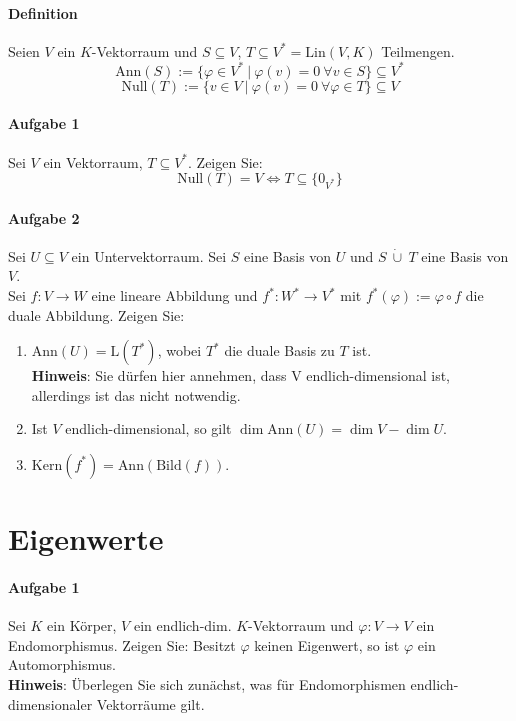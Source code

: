 \documentclass{scrartcl}
\begin{document}
	\paragraph{Definition}
	Seien $V$ ein $K$-Vektorraum und $S\subseteq V$, $T\subseteq V^*=\text{Lin}(V,K)$ Teilmengen.
	\[\text{Ann}(S):=\{\varphi\in V^*\ \vert\ \varphi(v)=0\ \forall v\in S\}\subseteq V^*\]
	\[\text{Null}(T):=\{v\in V\ \vert\ \varphi(v)=0\ \forall\varphi\in T\}\subseteq V\]
	\paragraph{Aufgabe 1}
	Sei $V$ ein Vektorraum, $T\subseteq V^*$. Zeigen Sie:
	\[\text{Null}(T)=V\Leftrightarrow T\subseteq\{0_{V^*}\}\]
	\paragraph{Aufgabe 2}
	Sei $U\subseteq V$ ein Untervektorraum. Sei $S$ eine Basis von $U$ und $S\ \dot\cup\ T$ eine Basis von $V$.\\
	Sei $f: V\to W$ eine lineare Abbildung und $f^*: W^*\to V^*$
	mit $f^*(\varphi):=\varphi\circ f$ die duale Abbildung. Zeigen Sie:
	\begin{enumerate}[label=(\alph*)]
		\item $\text{Ann}(U)=\text{L}(T^*)$, wobei $T^*$ die duale Basis zu $T$ ist.\\
		\textbf{Hinweis}: Sie dürfen hier annehmen, dass V endlich-dimensional ist,
		allerdings ist das nicht notwendig.
		\item Ist $V$ endlich-dimensional, so gilt $\dim \text{Ann}(U)=\dim V-\dim U$.
		\item $\text{Kern}(f^*)=\text{Ann}(\text{Bild}(f))$.
	\end{enumerate}
	\section{Eigenwerte}
	\paragraph{Aufgabe 1}
	Sei $K$ ein Körper, $V$ ein endlich-dim. $K$-Vektorraum und $\varphi:V\to V$ ein Endomorphismus.
	Zeigen Sie: Besitzt $\varphi$ keinen Eigenwert, so ist $\varphi$ ein Automorphismus.\\
	\textbf{Hinweis}: Überlegen Sie sich zunächst,
	was für Endomorphismen endlich-dimensionaler Vektorräume gilt.
\end{document}
